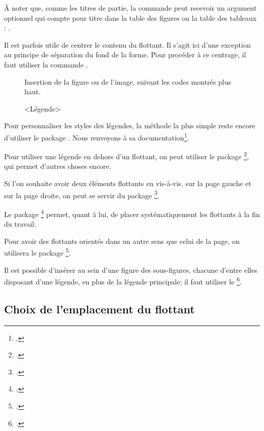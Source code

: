 À noter que, comme les titres de partie, la commande  peut recevoir un argument optionnel qui compte pour titre dans la table des figures ou la table des tableaux : 
. 


\begin{plusloins}

Il est parfois  utile de centrer le contenu du flottant. Il s'agit ici d'une exception au principe de séparation du fond de la forme. Pour procéder à ce centrage, il faut utiliser la commande .

\begin{latexcode}
\begin{figure}[<paramètre de placement>]
    \centering
    Insertion de la figure ou de l'image,
    suivant les codes montrés plus haut.
    \caption{<Légende>}
\end{figure} 
\end{latexcode}


Pour personnaliser les styles des légendes, la méthode la plus simple reste encore d'utiliser le package . Nous renvoyons à sa documentation\footcite{caption}.

Pour utiliser une légende en dehors d'un flottant, on peut utiliser le package \footcite{ccaption}, qui permet d'autres choses encore.

Si l'on souhaite avoir deux éléments flottants en vis-à-vis, sur la page gauche et sur la page droite, on peut  se servir du package \footcite{dpfloat}.

Le package \footcite{endfloat} permet, quant à lui, de placer systématiquement les flottants à la fin du travail.

Pour avoir des flottants orientés dans un autre sens que celui de la page, on utilisera le package \footcite{rotfloat}.

Il est possible d'insérer au sein d'une figure des sous-figures, chacune d'entre elles disposant d'une légende, en plus de la légende principale; il faut utiliser le  \footcite{subcaption}.
\end{plusloins}



\subsection{Choix de l'emplacement du flottant}

